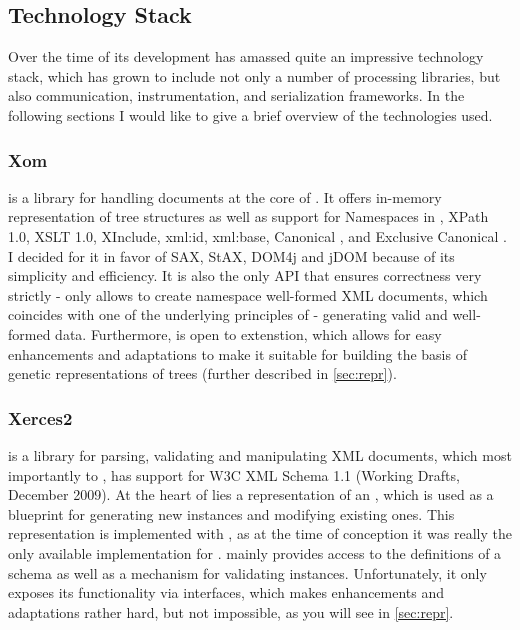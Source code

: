 \subsection{Technology Stack}
\label{sec:tech}
Over the time of its development \xmlmate has amassed quite an impressive technology stack, 
which has grown to include not only a number of \xml processing libraries, but also communication, instrumentation, and serialization frameworks. 
In the following sections I would like to give a brief overview of the technologies used.
\subsubsection{Xom}
\xom\cite{xom} is a \java library for handling \xml documents at the core of \xmlmate. 
It offers in-memory representation of \xml tree structures as well as support for Namespaces in \xml, {\small XPath 1.0}, {\small XSLT 1.0}, 
{\small XInclude}, {\small xml:id}, {\small xml:base}, Canonical \xml, and Exclusive Canonical \xml.
I decided for it in favor of {\small SAX}, {\small StAX}, {\small DOM4j} and {\small jDOM} because of its simplicity and efficiency.
It is also the only \xml API that ensures correctness very strictly - \xom only allows to create namespace well-formed XML documents, 
which coincides with one of the underlying principles of \xmlmate{} - generating valid and well-formed data.
Furthermore, \xom is open to extenstion, which allows for easy enhancements and adaptations to make it suitable 
for building the basis of genetic representations of \xml trees (further described in \cref{sec:repr}).
\subsubsection{Xerces2}
\xerces\cite{xerces} is a \java library for parsing, validating and manipulating XML documents, which most importantly to \xmlmate, has support for W3C XML Schema 1.1 (Working Drafts, December 2009). 
At the heart of \xmlmate lies a representation of an \xsd, which is used as a blueprint for generating new \xml instances and modifying existing ones. 
This representation is implemented with \xerces, as at the time of conception it was really the only available \xsd implementation for \java. 
\xerces mainly provides access to the definitions of a schema as well as a mechanism for validating \xml instances.
Unfortunately, it only exposes its functionality via \java interfaces, which makes enhancements and adaptations rather hard, but not impossible, as you will see in \cref{sec:repr}.
